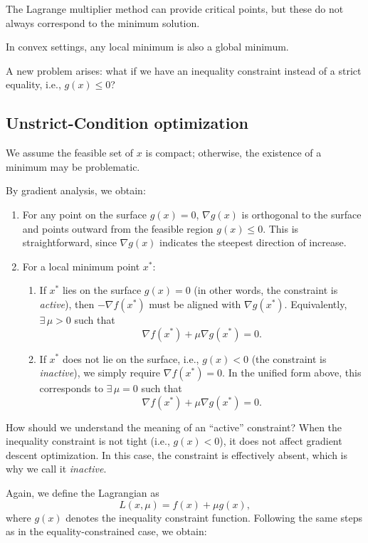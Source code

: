 \documentclass[../main]{subfiles}
\begin{document}
\begin{note}
    The Lagrange multiplier method can provide critical points, but these do not always correspond to the minimum solution.
\end{note}

\begin{note}
    In convex settings, any local minimum is also a global minimum.
\end{note}

A new problem arises: what if we have an inequality constraint instead of a strict equality, i.e., $g(x) \leq 0$?

\begin{remark}
\section{Unstrict-Condition optimization}
    We assume the feasible set of $x$ is compact; otherwise, the existence of a minimum may be problematic.
\end{remark}

By gradient analysis, we obtain:
\begin{enumerate}
    \item For any point on the surface $g(x)=0$, $\nabla g(x)$ is orthogonal to the surface and points outward from the feasible region $g(x)\leq 0$.  
    This is straightforward, since $\nabla g(x)$ indicates the steepest direction of increase.
    \item For a local minimum point $x^*$:
    \begin{enumerate}
        \item If $x^*$ lies on the surface $g(x)=0$ (in other words, the constraint is \emph{active}), then $-\nabla f(x^*)$ must be aligned with $\nabla g(x^*)$.  
        Equivalently, $\exists \,\mu > 0$ such that 
        \[
            \nabla f(x^*) + \mu \nabla g(x^*) = 0.
        \]
        \item If $x^*$ does not lie on the surface, i.e., $g(x)<0$ (the constraint is \emph{inactive}), we simply require $\nabla f(x^*)=0$.  
        In the unified form above, this corresponds to $\exists \,\mu=0$ such that 
        \[
            \nabla f(x^*) + \mu \nabla g(x^*) = 0.
        \]
    \end{enumerate}
\end{enumerate}

\begin{note}
    How should we understand the meaning of an ``active'' constraint?  
    When the inequality constraint is not tight (i.e., $g(x)<0$), it does not affect gradient descent optimization.  
    In this case, the constraint is effectively absent, which is why we call it \emph{inactive}.
\end{note}
Again, we define the Lagrangian as
\begin{equation}
    L(x, \mu) = f(x) + \mu g(x),
\end{equation}
where $g(x)$ denotes the inequality constraint function.  
Following the same steps as in the equality-constrained case, we obtain:
\end{document}
